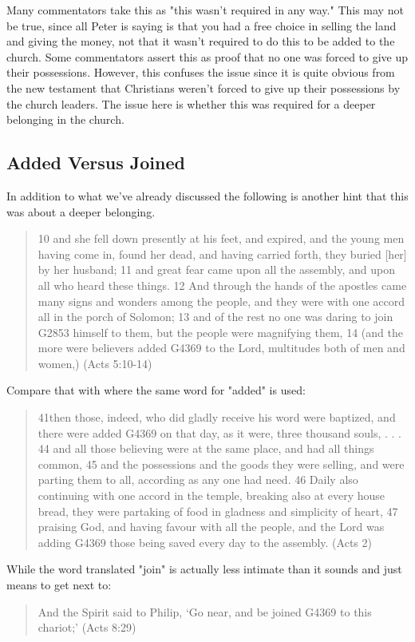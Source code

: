 \documentclass[11pt]{article}
\begin{document}
Many commentators take this as "this wasn't required in any way." This may not be true, since all Peter is saying is that you had a free choice in selling the land and giving the money, not that it wasn't required to do this to be added to the church. Some commentators assert this as proof that no one was forced to give up their possessions. However, this confuses the issue since it is quite obvious from the new testament that Christians weren't forced to give up their possessions by the church leaders. The issue here is whether this was required for a deeper belonging in the church.
\subsection{Added Versus Joined} \label{added versus joined}
In addition to what we've already discussed the following is another hint that this was about a deeper belonging.
\begin{quote}
10 and she fell down presently at his feet, and expired, and the young men having come in, found her dead, and having carried forth, they buried [her] by her husband;
11 and great fear came upon all the assembly, and upon all who heard these things.
12 And through the hands of the apostles came many signs and wonders among the people, and they were with one accord all in the porch of Solomon;
13 and of the rest no one was daring to join G2853 himself to them, but the people were magnifying them,
14 (and the more were believers added G4369 to the Lord, multitudes both of men and women,) (Acts 5:10-14)
\end{quote}
Compare that with where the same word for "added" is used:
\begin{quote}
 41then those, indeed, who did gladly receive his word were baptized, and there were added G4369 on that day, as it were, three thousand souls, . . .
44 and all those believing were at the same place, and had all things common,
45 and the possessions and the goods they were selling, and were parting them to all, according as any one had need.
46 Daily also continuing with one accord in the temple, breaking also at every house bread, they were partaking of food in gladness and simplicity of heart,
47 praising God, and having favour with all the people, and the Lord was adding G4369 those being saved every day to the assembly. (Acts 2)
\end{quote}
While the word translated "join" is actually less intimate than it sounds and just means to get next to:
\begin{quote}
And the Spirit said to Philip, `Go near, and be joined G4369 to this chariot;'
(Acts 8:29)
\end{quote}
\end{document}
